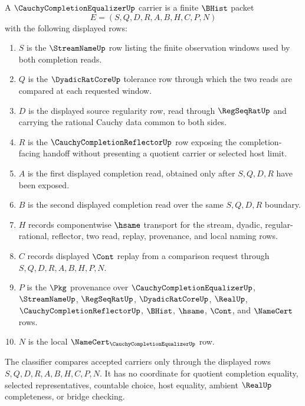 \begin{definition}
\label{def:cauchy-completion-equalizer-carrier}
A $\CauchyCompletionEqualizerUp$ carrier is a finite $\BHist$ packet
$$
E=(S,Q,D,R,A,B,H,C,P,N)
$$
with the following displayed rows:
\begin{enumerate}
\item $S$ is the $\StreamNameUp$ row listing the finite observation windows used by both completion reads.
\item $Q$ is the $\DyadicRatCoreUp$ tolerance row through which the two reads are compared at each requested window.
\item $D$ is the displayed source regularity row, read through $\RegSeqRatUp$ and carrying the rational Cauchy data common to both sides.
\item $R$ is the $\CauchyCompletionReflectorUp$ row exposing the completion-facing handoff without presenting a quotient carrier or selected host limit.
\item $A$ is the first displayed completion read, obtained only after $S,Q,D,R$ have been exposed.
\item $B$ is the second displayed completion read over the same $S,Q,D,R$ boundary.
\item $H$ records componentwise $\hsame$ transport for the stream, dyadic, regular-rational, reflector, two read, replay, provenance, and local naming rows.
\item $C$ records displayed $\Cont$ replay from a comparison request through $S,Q,D,R,A,B,H,P,N$.
\item $P$ is the $\Pkg$ provenance over $\CauchyCompletionEqualizerUp$, $\StreamNameUp$, $\RegSeqRatUp$, $\DyadicRatCoreUp$, $\RealUp$, $\CauchyCompletionReflectorUp$, $\BHist$, $\hsame$, $\Cont$, and $\NameCert$ rows.
\item $N$ is the local $\NameCert_{\CauchyCompletionEqualizerUp}$ row.
\end{enumerate}
The classifier compares accepted carriers only through the displayed rows $S,Q,D,R,A,B,H,C,P,N$. It has no coordinate for quotient completion equality, selected representatives, countable choice, host equality, ambient $\RealUp$ completeness, or bridge checking.
\end{definition}

